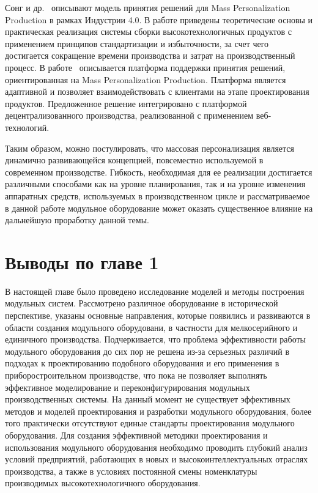 Сонг и др.~\cite{song2020product} описывают модель принятия решений для Mass Personalization Production в рамках Индустрии 4.0. В работе приведены теоретические основы и практическая реализация системы сборки высокотехнологичных продуктов с применением принципов стандартизации и избыточности, за счет чего достигается сокращение времени производства и затрат на производственный процесс. В работе~\cite{mourtzis2014web} описывается платформа поддержки принятия решений, ориентированная на Mass Personalization Production. Платформа является адаптивной и позволяет взаимодействовать с клиентами на этапе проектирования продуктов. Предложенное решение интегрировано с платформой децентрализованного производства, реализованной с применением веб-технологий.

Таким образом, можно постулировать, что массовая персонализация является динамично развивающейся концепцией, повсеместно используемой в современном производстве. Гибкость, необходимая для ее реализации достигается различными способами как на уровне планирования, так и на уровне изменения аппаратных средств, используемых в производственном цикле и рассматриваемое в данной работе модульное оборудование может оказать существенное влияние на дальнейшую проработку данной темы.

\section{Выводы по главе 1}

В настоящей главе было проведено исследование моделей и методы построения модульных систем. Рассмотрено различное оборудование в исторической перспективе, указаны основные направления, которые появились и развиваются в области создания модульного оборудовани, в частности для мелкосерийного и единичного производства. Подчеркивается, что проблема эффективности работы модульного оборудования до сих пор не решена из-за серьезных различий в подходах к проектированию подобного оборудования и его применения в приборостроительном производстве, что пока не позволяет выполнять эффективное моделирование и переконфигурирования модульных производственных системы. На данный момент не существует эффективных методов и моделей проектирования и разработки модульного оборудования, более того практически отсутствуют единые стандарты проектирования модульного оборудования. Для создания эффективной методики проектирования и использования модульного оборудования необходимо проводить глубокий анализ условий предприятий, работающих в новых и высокоинтеллектуальных отраслях производства, а также в условиях постоянной смены номенклатуры производимых высокотехнологичного оборудования.

\FloatBarrier
